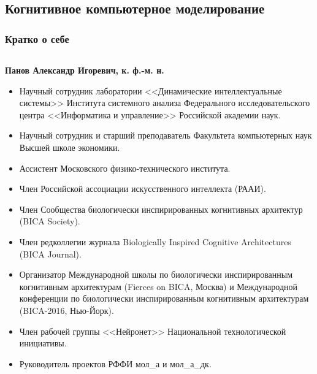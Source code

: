 \documentclass[default]{beamer}
\begin{document}
	\subsection{Когнитивное компьютерное моделирование}
	\begin{frame}
		\frametitle{Кратко о себе}
		\scriptsize
		\begin{columns}
			\begin{column}{0.85\textwidth}
				\textbf{Панов Александр Игоревич, к. ф.-м. н.}
				\begin{itemize}
					\item Научный сотрудник лаборатории <<Динамические интеллектуальные системы>> Института системного анализа Федерального исследовательского центра <<Информатика и управление>> Российской академии наук.
					\item Научный сотрудник и старший преподаватель Факультета компьютерных наук Высшей школе экономики.
					\item Ассистент Московского физико-технического института.
					\item Член Российской ассоциации искусственного интеллекта (РААИ).
					\item Член Сообщества биологически инспирированных когнитивных архитектур (BICA Society).
					\item Член редколлегии журнала Biologically Inspired Cognitive Architectures (BICA Journal).
					\item Организатор Международной	школы по биологически инспирированным когнитивным архитектурам (Fierces on BICA, Москва) и Международной конференции по биологически инспирированным когнитивным архитектурам (BICA-2016, Нью-Йорк).
					\item Член рабочей группы <<Нейронет>> Национальной технологической инициативы.
					\item Руководитель проектов РФФИ мол\_а и мол\_а\_дк.
				\end{itemize}
			\end{column}
			

\end{columns}
\end{frame}
\end{document}
